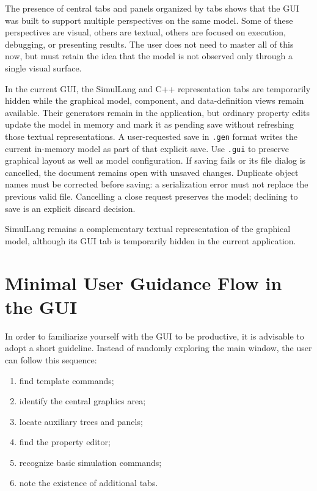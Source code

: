 The presence of central tabs and panels organized by tabs shows that the GUI was built to support multiple perspectives on the same model. Some of these perspectives are visual, others are textual, others are focused on execution, debugging, or presenting results. The user does not need to master all of this now, but must retain the idea that the model is not observed only through a single visual surface.

In the current GUI, the SimulLang and C++ representation tabs are temporarily
hidden while the graphical model, component, and data-definition views remain
available. Their generators remain in the application, but ordinary property
edits update the model in memory and mark it as pending save without refreshing
those textual representations. A user-requested save in \texttt{.gen} format
writes the current in-memory model as part of that explicit save. Use
\texttt{.gui} to preserve graphical layout as well as model configuration.
If saving fails or its file dialog is cancelled, the document remains open with
unsaved changes. Duplicate object names must be corrected before saving: a
serialization error must not replace the previous valid file. Cancelling a close
request preserves the model; declining to save is an explicit discard decision.

SimulLang remains a complementary textual representation of the graphical
model, although its GUI tab is temporarily hidden in the current application.

\section{Minimal User Guidance Flow in the GUI}
\label{sec:cap3_fluxo_minimo_orientacao}

In order to familiarize yourself with the GUI to be productive, it is advisable to adopt a short guideline. Instead of randomly exploring the main window, the user can follow this sequence:

\begin{enumerate}
\item find template commands;
\item identify the central graphics area;
\item locate auxiliary trees and panels;
\item find the property editor;
\item recognize basic simulation commands;
\item note the existence of additional tabs.
\end{enumerate}

